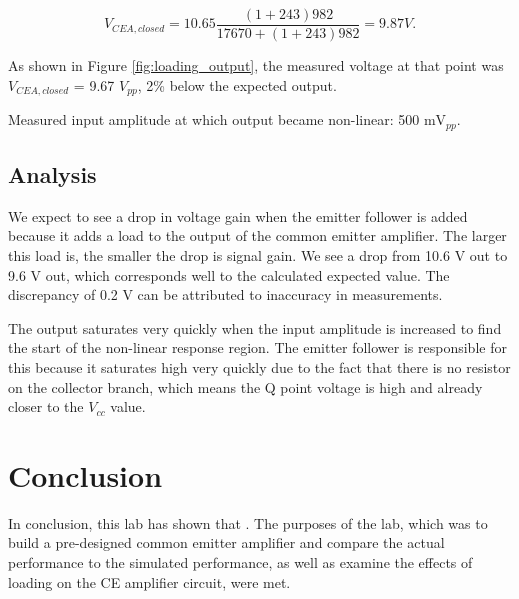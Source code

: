 \documentclass[12pt,letterpaper]{report}
\begin{document}
$$
V_{CEA,closed} = 10.65 \frac{(1+243)982}{17670+(1+243)982} = 9.87 V.
$$

As shown in Figure \ref{fig:loading_output}, the measured voltage at that point was $V_{CEA,closed}$ = 9.67 $V_{pp}$, 2\% below the expected output.

Measured input amplitude at which output became non-linear: 500 m$\text{V}_{pp}$.



\subsection*{Analysis}

We expect to see a drop in voltage gain when the emitter follower is added because it adds a load to the output of the common emitter amplifier. The larger this load is, the smaller the drop is signal gain. We see a drop from 10.6 V out to 9.6 V out, which corresponds well to the calculated expected value. The discrepancy of 0.2 V can be attributed to inaccuracy in measurements.

The output saturates very quickly when the input amplitude is increased to find the start of the non-linear response region. The emitter follower is responsible for this because it saturates high very quickly due to the fact that there is no resistor on the collector branch, which means the Q point voltage is high and already closer to the $V_{cc}$ value.

\section*{Conclusion}

In conclusion, this lab has shown that 
. The purposes of the lab, which was to build a pre-designed common emitter amplifier and compare the actual performance to the simulated performance, as well as  examine the effects of loading on the CE amplifier circuit, were met.
\end{document}

